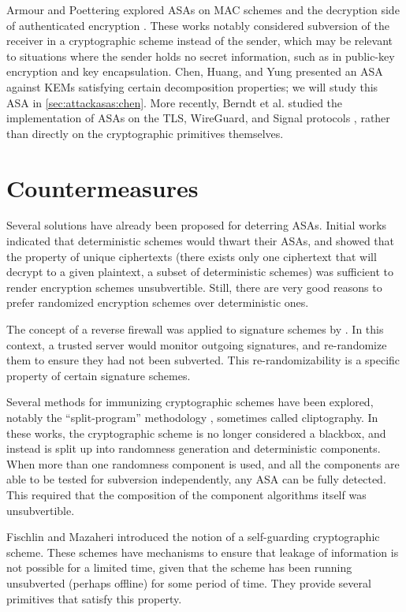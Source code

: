 Armour and Poettering explored ASAs on MAC schemes and the decryption side of authenticated encryption \cite{ToSC:ArmPoe19,IMA:ArmPoe19}. These works notably considered subversion of the receiver in a cryptographic scheme instead of the sender, which may be relevant to situations where the sender holds no secret information, such as in public-key encryption and key encapsulation. Chen, Huang, and Yung \cite{AC:CheHuaYun20} presented an ASA against KEMs satisfying certain decomposition properties; we will study this ASA in \autoref{sec:attackasas:chen}. More recently, Berndt et al. studied the implementation of ASAs on the TLS, WireGuard, and Signal protocols \cite{EPRINT:BWPTE20}, rather than directly on the cryptographic primitives themselves.

\section{Countermeasures}

Several solutions have already been proposed for deterring ASAs. Initial works \cite{C:BelPatRog14,FSE:DegFarPoe15,CCS:BelJaeKan15} indicated that deterministic schemes would thwart their ASAs, and showed that the property of unique ciphertexts (there exists only one ciphertext that will decrypt to a given plaintext, a subset of deterministic schemes) was sufficient to render encryption schemes unsubvertible. Still, there are very good reasons to prefer randomized encryption schemes over deterministic ones.

The concept of a reverse firewall was applied to signature schemes by \cite{CCS:AteMagVen15}. In this context, a trusted server would monitor outgoing signatures, and re-randomize them to ensure they had not been subverted. This re-randomizability is a specific property of certain signature schemes.

Several methods for immunizing cryptographic schemes have been explored, notably the ``split-program'' methodology \cite{CCS:RTYZ17,AC:RTYZ16,CCS:TanYun17}, sometimes called cliptography. In these works, the cryptographic scheme is no longer considered a blackbox, and instead is split up into randomness generation and deterministic components. When more than one randomness component is used, and all the components are able to be tested for subversion independently, any ASA can be fully detected. This required that the composition of the component algorithms itself was unsubvertible.

Fischlin and Mazaheri \cite{CSF:FisMaz18} introduced the notion of a self-guarding cryptographic scheme. These schemes have mechanisms to ensure that leakage of information is not possible for a limited time, given that the scheme has been running unsubverted (perhaps offline) for some period of time. They provide several primitives that satisfy this property.


